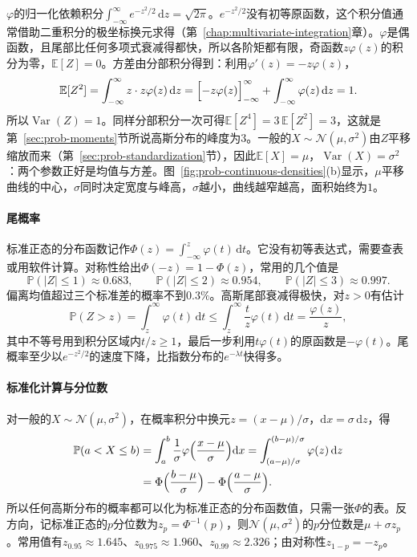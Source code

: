 $\varphi$的归一化依赖积分$\int_{-\infty}^{\infty}e^{-z^2/2}\,\mathrm{d}z=\sqrt{2\pi}$。$e^{-z^2/2}$没有初等原函数，这个积分值通常借助二重积分的极坐标换元求得（第~\ref{chap:multivariate-integration}章）。$\varphi$是偶函数，且尾部比任何多项式衰减得都快，所以各阶矩都有限，奇函数$z\varphi(z)$的积分为零，$\mathbb{E}[Z]=0$。方差由分部积分得到：利用$\varphi'(z)=-z\varphi(z)$，
\[
  \mathbb{E}[Z^2]=\int_{-\infty}^{\infty}z\cdot z\varphi(z)\,\mathrm{d}z=\Bigl[-z\varphi(z)\Bigr]_{-\infty}^{\infty}+\int_{-\infty}^{\infty}\varphi(z)\,\mathrm{d}z=1 .
\]
所以$\operatorname{Var}(Z)=1$。同样分部积分一次可得$\mathbb{E}[Z^4]=3\,\mathbb{E}[Z^2]=3$，这就是第~\ref{sec:prob-moments}节所说高斯分布的峰度为$3$。一般的$X\sim\mathcal{N}(\mu,\sigma^2)$由$Z$平移缩放而来（第~\ref{sec:prob-standardization}节），因此$\mathbb{E}[X]=\mu$，$\operatorname{Var}(X)=\sigma^2$：两个参数正好是均值与方差。图~\ref{fig:prob-continuous-densities}(b)显示，$\mu$平移曲线的中心，$\sigma$同时决定宽度与峰高，$\sigma$越小，曲线越窄越高，面积始终为$1$。

\paragraph{尾概率}
标准正态的分布函数记作$\Phi(z)=\int_{-\infty}^z\varphi(t)\,\mathrm{d}t$。它没有初等表达式，需要查表或用软件计算。对称性给出$\Phi(-z)=1-\Phi(z)$，常用的几个值是
\[
  \mathbb{P}(|Z|\leq1)\approx0.683,\qquad \mathbb{P}(|Z|\leq2)\approx0.954,\qquad \mathbb{P}(|Z|\leq3)\approx0.997 .
\]
偏离均值超过三个标准差的概率不到$0.3\%$。高斯尾部衰减得极快，对$z>0$有估计
\[
  \mathbb{P}(Z>z)=\int_z^\infty\varphi(t)\,\mathrm{d}t\leq\int_z^\infty\frac tz\varphi(t)\,\mathrm{d}t=\frac{\varphi(z)}{z},
\]
其中不等号用到积分区域内$t/z\geq1$，最后一步利用$t\varphi(t)$的原函数是$-\varphi(t)$。尾概率至少以$e^{-z^2/2}$的速度下降，比指数分布的$e^{-\lambda t}$快得多。

\paragraph{标准化计算与分位数}
对一般的$X\sim\mathcal{N}(\mu,\sigma^2)$，在概率积分中换元$z=(x-\mu)/\sigma$，$\mathrm{d}x=\sigma\,\mathrm{d}z$，得
\[
  \begin{aligned}
  \mathbb{P}(a<X\leq b)&=\int_a^b\frac1\sigma\varphi\Bigl(\frac{x-\mu}{\sigma}\Bigr)\mathrm{d}x=\int_{(a-\mu)/\sigma}^{(b-\mu)/\sigma}\varphi(z)\,\mathrm{d}z\\
  &=\Phi\Bigl(\frac{b-\mu}{\sigma}\Bigr)-\Phi\Bigl(\frac{a-\mu}{\sigma}\Bigr).
  \end{aligned}
\]
所以任何高斯分布的概率都可以化为标准正态的分布函数值，只需一张$\Phi$的表。反方向，记标准正态的$p$分位数为$z_p=\Phi^{-1}(p)$，则$\mathcal{N}(\mu,\sigma^2)$的$p$分位数是$\mu+\sigma z_p$。常用值有$z_{0.95}\approx1.645$、$z_{0.975}\approx1.960$、$z_{0.99}\approx2.326$；由对称性$z_{1-p}=-z_p$。

